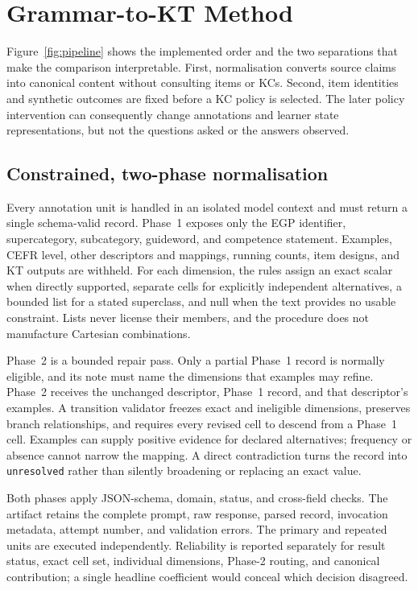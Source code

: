 \section{Grammar-to-KT Method}
\label{sec:method}

Figure~\ref{fig:pipeline} shows the implemented order and the two separations
that make the comparison interpretable.  First, normalisation converts source
claims into canonical content without consulting items or KCs.  Second, item
identities and synthetic outcomes are fixed before a KC policy is selected.
The later policy intervention can consequently change annotations and learner
state representations, but not the questions asked or the answers observed.



\subsection{Constrained, two-phase normalisation}

Every annotation unit is handled in an isolated model context and must return a
single schema-valid record.  Phase~1 exposes only the EGP identifier,
supercategory, subcategory, guideword, and competence statement.  Examples,
CEFR level, other descriptors and mappings, running counts, item designs, and
KT outputs are withheld.  For each dimension, the rules assign an exact scalar
when directly supported, separate cells for explicitly independent
alternatives, a bounded list for a stated superclass, and null when the text
provides no usable constraint.  Lists never license their members, and the
procedure does not manufacture Cartesian combinations.

Phase~2 is a bounded repair pass.  Only a partial Phase~1 record is normally
eligible, and its note must name the dimensions that examples may refine.
Phase~2 receives the unchanged descriptor, Phase~1 record, and that
descriptor's examples.  A transition validator freezes exact and ineligible
dimensions, preserves branch relationships, and requires every revised cell
to descend from a Phase~1 cell.  Examples can supply positive evidence for
declared alternatives; frequency or absence cannot narrow the mapping.  A
direct contradiction turns the record into \texttt{unresolved} rather than
silently broadening or replacing an exact value.

Both phases apply JSON-schema, domain, status, and cross-field checks.  The
artifact retains the complete prompt, raw response, parsed record, invocation
metadata, attempt number, and validation errors.  The primary and repeated
units are executed independently.  Reliability is reported separately for
result status, exact cell set, individual dimensions, Phase-2 routing, and
canonical contribution; a single headline coefficient would conceal which
decision disagreed.

